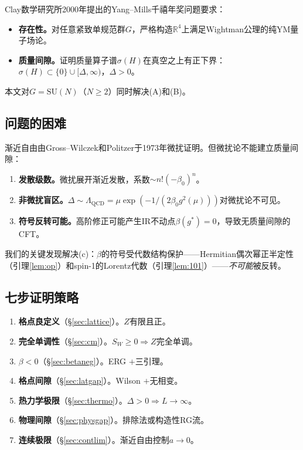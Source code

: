 \documentclass[12pt,a4paper]{article}
\theoremstyle{plain}
\theoremstyle{definition}
\theoremstyle{remark}
\begin{document}
Clay数学研究所2000年提出的Yang--Mills千禧年奖问题\cite{JaffeWitten2000}要求：

\begin{itemize}[leftmargin=2.5em]
\item[\textbf{(A)}] \textbf{存在性。}对任意紧致单规范群$G$，严格构造$\mathbb{R}^4$上满足Wightman公理的纯YM量子场论。
\item[\textbf{(B)}] \textbf{质量间隙。}证明质量算子谱$\sigma(H)$在真空之上有正下界：$\sigma(H)\subset\{0\}\cup[\Delta,\infty)$，$\Delta>0$。
\end{itemize}

本文对$G=\mathrm{SU}(N)$（$N\geq 2$）同时解决(A)和(B)。

\subsection{问题的困难}\label{sec:difficulty}

渐近自由由Gross--Wilczek\cite{GrossWilczek1973}和Politzer\cite{Politzer1973}于1973年微扰证明。但微扰论不能建立质量间隙：

\begin{enumerate}[label=(\alph*),leftmargin=2.5em]
\item \textbf{发散级数。}微扰展开渐近发散，系数$\sim n!(-\beta_0)^n$。
\item \textbf{非微扰盲区。}$\Delta\sim\Lambda_{\mathrm{QCD}}=\mu\exp(-1/(2\beta_0 g^2(\mu)))$对微扰论不可见。
\item \textbf{符号反转可能。}高阶修正可能产生IR不动点$\beta(g^*)=0$，导致无质量间隙的CFT。
\end{enumerate}

我们的关键发现解决(c)：$\beta$的符号受代数结构保护——Hermitian偶次幂正半定性（引理\ref{lem:op}）和spin-1的Lorentz代数（引理\ref{lem:101}）——\emph{不可能}被反转。

\subsection{七步证明策略}\label{sec:strategy}

\begin{enumerate}[label=\textbf{S\arabic*},leftmargin=3em]
\item \textbf{格点良定义}（\S\ref{sec:lattice}）。$Z$有限且正。
\item \textbf{完全单调性}（\S\ref{sec:cm}）。$S_W\geq 0\Rightarrow Z$完全单调。
\item \textbf{$\beta<0$}（\S\ref{sec:betaneg}）。ERG $+$三引理。
\item \textbf{格点间隙}（\S\ref{sec:latgap}）。Wilson $+$无相变。
\item \textbf{热力学极限}（\S\ref{sec:thermo}）。$\Delta>0\Rightarrow L\to\infty$。
\item \textbf{物理间隙}（\S\ref{sec:physgap}）。排除法或构造性RG流。
\item \textbf{连续极限}（\S\ref{sec:contlim}）。渐近自由控制$a\to 0$。
\end{enumerate}
\end{document}
